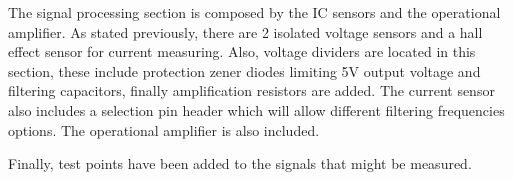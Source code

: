 The signal processing section is composed by the IC sensors and the operational amplifier. As stated previously, there are 2 isolated voltage sensors and a hall effect sensor for current measuring. Also, voltage dividers are located in this section, these include protection zener diodes limiting 5V output voltage and filtering capacitors, finally amplification resistors are added. The current sensor also includes a selection pin header which will allow different filtering frequencies options. The operational amplifier is also included. 

Finally, test points have been added to the signals that might be measured.
